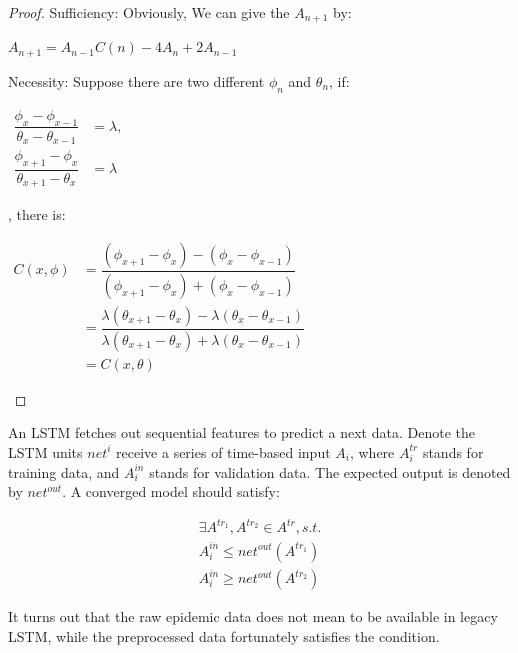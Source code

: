 \documentclass[]{article}
\begin{document}
\begin{proof}
Sufficiency: Obviously, We can give the $A_{n+1}$ by:
\begin{center}
	\begin{math}
	A_{n+1} = A_{n-1}C(n) - 4A_n + 2A_{n-1}
	\end{math}
\end{center}
Necessity: Suppose there are two different $\phi_{n}$ and $\theta_{n}$, if:
\begin{center}
	\begin{math}
		\begin{aligned}
	\dfrac{\phi_x - \phi_{x-1}}{\theta_x - \theta_{x-1}} &= \lambda, 
	\\
	\dfrac{\phi_{x+1} - \phi_{x}}{\theta_{x+1} - \theta_{x}} &= \lambda
		\end{aligned}
	\end{math}
\end{center}
, there is:
\begin{center}
	\begin{math}
		\begin{aligned}
	C(x, \phi)&=
	\dfrac{ (\phi_{x+1} - \phi_{x}) - (\phi_{x} -  \phi_{x-1}) } { (\phi_{x+1} - \phi_{x}) + (\phi_{x} - \phi_{x-1}) }
	\\
	&= 	\dfrac{ \lambda(\theta_{x+1} - \theta_{x}) - \lambda(\theta_x - \theta_{x-1}) } { \lambda(\theta_{x+1} - \theta_x) + \lambda(\theta_x - \theta_{x-1}) }
	\\
	&= C(x, \theta)
		\end{aligned}
	\end{math}
\end{center}
\end{proof}
\par
An LSTM\cite{HochSchm97} fetches out sequential features to predict a next data. Denote the LSTM units $net^{i}$ receive a series of time-based input $A_{i}$, where $A^{tr}_{i}$ stands for training data, and $A^{in}_{i}$ stands for validation data. The expected output is denoted by $net^{out}$. A converged model should satisfy:
\begin{center}
	\begin{gather}
		\exists A^{tr_1}, A^{tr_2} \in A^{tr}, s.t.\\
		A^{in}_{i} \leqslant net^{out}(A^{tr_1})\\
		A^{in}_{i} \geqslant net^{out}(A^{tr_2})
	\end{gather}
\end{center}
It turns out that the raw epidemic data does not mean to be available in legacy LSTM, while the preprocessed data fortunately satisfies the condition.
\end{document}
